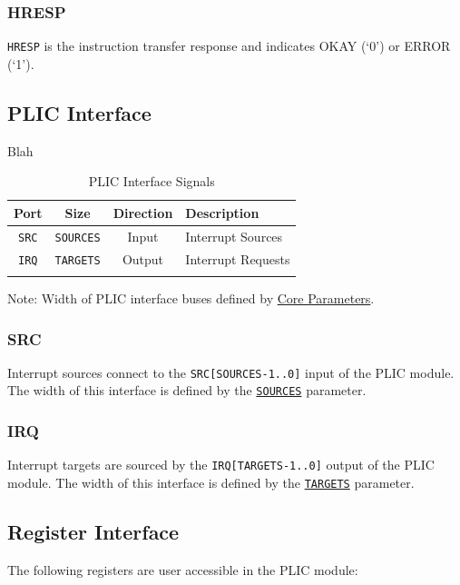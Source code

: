 \documentclass[]{article}
\begin{document}
\subsubsection{HRESP}

\texttt{HRESP} is the instruction transfer response and indicates OKAY
(`0') or ERROR (`1').

\subsection{PLIC Interface}

Blah

\begin{longtable}[]{@{}cccl@{}}
\toprule
\textbf{Port} & \textbf{Size} & \textbf{Direction} &
\textbf{Description}\tabularnewline
\midrule
\endhead
\texttt{SRC} & \texttt{SOURCES} & Input & Interrupt
Sources\tabularnewline
\texttt{IRQ} & \texttt{TARGETS} & Output & Interrupt
Requests\tabularnewline
\bottomrule
\caption{PLIC Interface Signals}
\label{tab:PLICIF}
\end{longtable}

Note: Width of PLIC interface buses defined by
\protect\hyperlink{core-parameters}{Core Parameters}.

\subsubsection{SRC}

Interrupt sources connect to the \texttt{SRC{[}SOURCES-1..0{]}} input of
the PLIC module. The width of this interface is defined by the
\protect\hyperlink{SOURCES}{\texttt{SOURCES}} parameter.

\subsubsection{IRQ}

Interrupt targets are sourced by the \texttt{IRQ{[}TARGETS-1..0{]}}
output of the PLIC module. The width of this interface is defined by the
\protect\hyperlink{TARGETS}{\texttt{TARGETS}} parameter.

\subsection{Register Interface}

The following registers are user accessible in the PLIC module:
\end{document}
